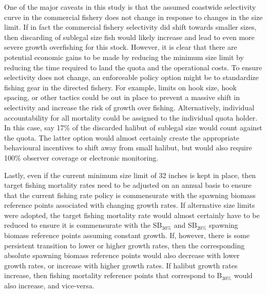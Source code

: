 One of the major caveats in this study is that the assumed coastwide selectivity curve in the commercial fishery does not change in response to changes in the size limit.  If in fact the commercial fishery selectivity did shift towards smaller sizes, then discarding of sublegal size fish would likely increase and lead to even more severe growth overfishing for this stock.  However, it is clear that there are potential economic gains to be made by reducing the minimum size limit by reducing the time required to land the quota and the operational costs.  To ensure selectivity does not change, an enforceable policy option might be to standardize fishing gear in the directed fishery.  For example, limits on hook size, hook spacing, or other tactics could be out in place to prevent a massive shift in selectivity and increase the risk of growth over fishing.  Alternatively, individual accountability for all mortality could be assigned to the individual quota holder.  In this case, say 17\% of the discarded halibut of sublegal size would count against the quota.  The latter option would almost certainly create the appropriate behavioural incentives to shift away from small halibut, but would also require 100\% observer coverage or electronic monitoring.

Lastly, even if the current minimum size limit of 32 inches is kept in place, then target fishing mortality rates need to be adjusted on an annual basis to ensure that the current fishing rate policy is commensurate with the spawning biomass reference points associated with changing growth rates.  If alternative size limits were adopted, the target fishing mortality rate would almost certainly have to be reduced to ensure it is commensurate with the SB$_{30\%}$ and SB$_{20\%}$   spawning biomass reference points assuming constant growth.  If, however, there is some persistent transition to lower or higher growth rates, then the corresponding absolute spawning biomass reference points would also decrease with lower growth rates, or increase with higher growth rates.  If halibut growth rates increase, then fishing mortality reference points that correspond to B$_{30\%}$ would also increase, and vice-versa.



